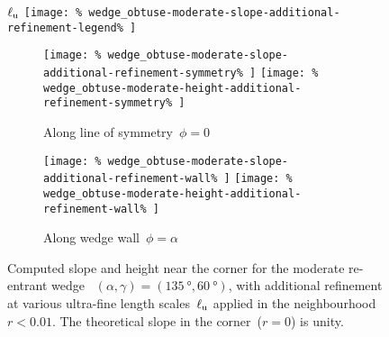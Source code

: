 \begin{figure}
  \newcommand*{\subfigurewidth}{0.4\textwidth}
  \centering
  $\ell_{\mathrm{u}}$
  \texttt{[image: \%
    wedge\_obtuse-moderate-slope-additional-refinement-legend\%
  ]}
  \hspace*{\fill}
  \begin{subfigure}[t]{\subfigurewidth}
    \texttt{[image: \%
      wedge\_obtuse-moderate-slope-additional-refinement-symmetry\%
    ]}
    \texttt{[image: \%
      wedge\_obtuse-moderate-height-additional-refinement-symmetry\%
    ]}
    \caption{%
      Along line of symmetry~$\phi = 0$
    }
    \label{fig:wedge_obtuse-moderate-additional-refinement-symmetry}
  \end{subfigure}
    \hfill
  \begin{subfigure}[t]{\subfigurewidth}
    \texttt{[image: \%
      wedge\_obtuse-moderate-slope-additional-refinement-wall\%
    ]}
    \texttt{[image: \%
      wedge\_obtuse-moderate-height-additional-refinement-wall\%
    ]}
    \caption{%
      Along wedge wall~$\phi = \alpha$
    }
    \label{fig:wedge_obtuse-moderate-additional-refinement-wall}
  \end{subfigure}
  \hspace*{\fill}
  \caption{
    Computed slope and height near the corner
    for the moderate re-entrant wedge~%
      $(\alpha, \gamma) = (\SI{135}{\degree}, \SI{60}{\degree})$,
    with additional refinement
    at various ultra-fine length scales~$\ell_{\mathrm{u}}$
    applied in the neighbourhood~$r < 0.01$.
    The theoretical slope in the corner~($r = 0$) is unity.
  }
  \label{fig:wedge_obtuse-moderate-additional-refinement}
\end{figure}

